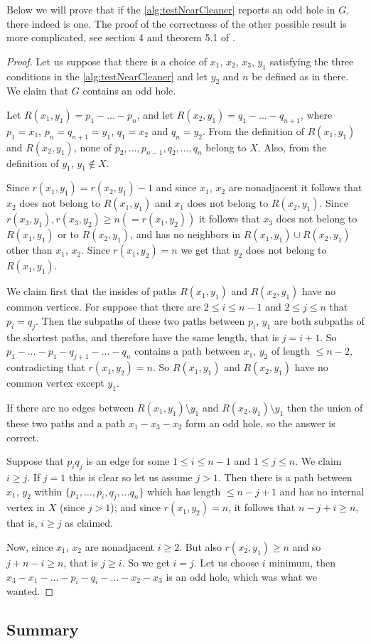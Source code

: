 Below we will prove that if the \cref{alg:testNearCleaner} reports an odd hole in $G$, there indeed is one. The proof of the correctness of the other possible result is more complicated, see section 4 and theorem 5.1 of \cite{MC05}.

\begin{proof}
	Let us suppose that there is a choice of $x_1$, $x_2$, $x_3$, $y_1$ satisfying the three conditions in the \cref{alg:testNearCleaner} and let $y_2$ and $n$ be defined as in there. We claim that $G$ contains an odd hole.

	Let $R(x_1, y_1) = p_1-\ldots -p_n$, and let $R(x_2, y_1) = q_1-\ldots -q_{n+1}$, where $p_1 = x_1$, $p_n = q_{n+1} = y_1$, $q_1 = x_2$ and $q_n = y_2$. From the definition of $R(x_1, y_1)$ and $R(x_2, y_1)$, none of $p_2, \ldots, p_{n-1}, q_2, \ldots, q_n$ belong to $X$. Also, from the definition of $y_1$, $y_1 \notin X$.

	Since $r(x_1, y_1) = r(x_2, y_1) - 1$ and since $x_1$, $x_2$ are nonadjacent it follows that $x_2$ does not belong to $R(x_1, y_1)$ and $x_1$ does not belong to $R(x_2, y_1)$. Since $r(x_3, y_1), r(x_3, y_2) \geq n (= r(x_1, y_2))$ it follows that $x_3$ does not belong to $R(x_1, y_1)$ or to $R(x_2, y_1)$, and has no neighbors in $R(x_1, y_1) \cup R(x_2, y_1)$ other than $x_1$, $x_2$. Since $r(x_1, y_2) = n$ we get that $y_2$ does not belong to $R(x_1, y_1)$.

	We claim first that the insides of paths $R(x_1, y_1)$ and $R(x_2, y_1)$ have no common vertices. For suppose that there are $2 \leq i \leq n-1$ and $2 \leq j \leq n$ that $p_i = q_j$. Then the subpaths of these two paths between $p_i$, $y_1$ are both subpaths of the shortest paths, and therefore have the same length, that is $j=i+1$. So $p_1-\ldots-p_1-q_{j+1}-\ldots-q_n$ contains a path between $x_1$, $y_2$ of length $\leq n-2$, contradicting that $r(x_1, y_2) = n$. So $R(x_1, y_1)$ and $R(x_2, y_1)$ have no common vertex except $y_1$.

	If there are no edges between $R(x_1, y_1) \setminus y_1$ and $R(x_2, y_1) \setminus y_1$ then the union of these two paths and a path $x_1-x_3-x_2$ form an odd hole, so the answer is correct.

	Suppose that $p_iq_j$ is an edge for some $1\leq i \leq n-1$ and $1 \leq j \leq n$. We claim $i \geq j$. If $j = 1$ this is clear so let us assume $j > 1$. Then there is a path between $x_1$, $y_2$ within $\{p_1, \ldots , p_i, q_j, \ldots q_n\}$ which has length $\leq n-j+1$ and has no internal vertex in $X$ (since $j > 1$); and since $r(x_1, y_2) = n$, it follows that $n-j+i \geq n$, that is, $i \geq j$ as claimed.

	Now, since $x_1$, $x_2$ are nonadjacent $i \geq 2$. But also $r(x_2, y_1) \geq n$ and so $j+n-i \geq n$, that is $j \geq i$. So we get $i=j$. Let us choose $i$ minimum, then $x_3-x_1-\ldots-p_i-q_i-\ldots-x_2-x_3$ is an odd hole, which was what we wanted.
\end{proof}

\subsection{Summary}

